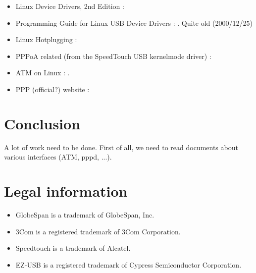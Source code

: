 \documentclass[a4paper,12pt]{article}
\begin{document}
\begin{itemize}
  
\item Linux Device Drivers, 2nd Edition :

\item Programming Guide for Linux USB Device Drivers :
  .
  Quite old (2000/12/25)
  
\item Linux Hotplugging :
  
\item PPPoA related (from the SpeedTouch USB kernelmode driver) :
  
\item ATM on Linux :
  .
  
\item PPP (official?) website :
  
\end{itemize}

\section{Conclusion}

A lot of work need to be done. First of all, we need to read documents
about various interfaces (ATM, pppd, ...).

\section{Legal information}

\begin{itemize}
\item GlobeSpan is a trademark of GlobeSpan, Inc.
\item 3Com is a registered trademark of 3Com Corporation.
\item Speedtouch is a trademark of Alcatel.
\item EZ-USB is a registered trademark of Cypress Semiconductor Corporation.
\end{itemize}
\end{document}
